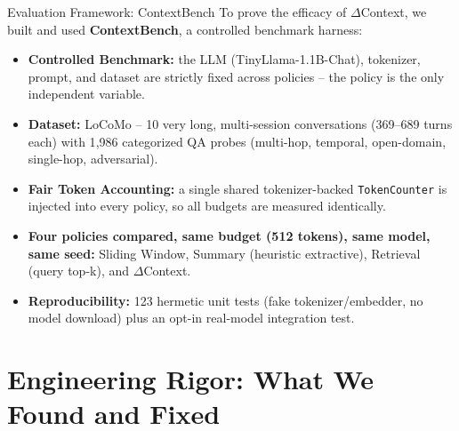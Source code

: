 \documentclass[aspectratio=169]{beamer}
\begin{document}
\begin{frame}{Evaluation Framework: ContextBench}
    To prove the efficacy of $\Delta$Context, we built and used \textbf{ContextBench}, a controlled benchmark harness:
    \begin{itemize}
        \item \textbf{Controlled Benchmark:} the LLM (TinyLlama-1.1B-Chat), tokenizer, prompt, and dataset are strictly fixed across policies -- the policy is the only independent variable.
        \item \textbf{Dataset:} LoCoMo -- 10 very long, multi-session conversations (369--689 turns each) with 1{,}986 categorized QA probes (multi-hop, temporal, open-domain, single-hop, adversarial).
        \item \textbf{Fair Token Accounting:} a single shared tokenizer-backed \texttt{TokenCounter} is injected into every policy, so all budgets are measured identically.
        \item \textbf{Four policies compared, same budget (512 tokens), same model, same seed:} Sliding Window, Summary (heuristic extractive), Retrieval (query top-k), and $\Delta$Context.
        \item \textbf{Reproducibility:} 123 hermetic unit tests (fake tokenizer/embedder, no model download) plus an opt-in real-model integration test.
    \end{itemize}
\end{frame}

\section{Engineering Rigor: What We Found and Fixed}
\end{document}
